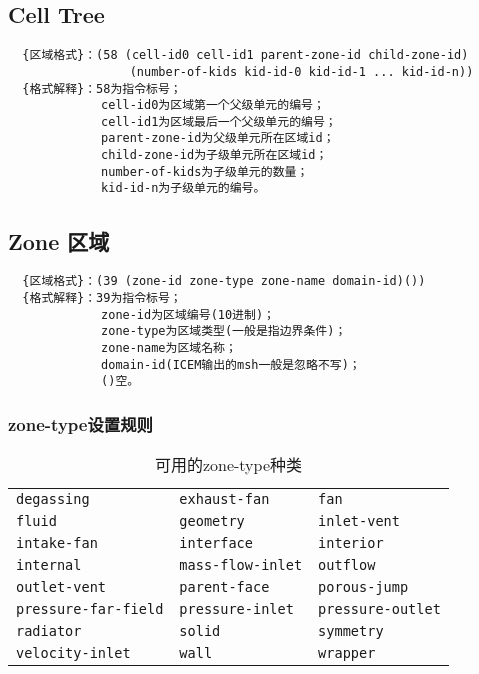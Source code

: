 \documentclass[lang=cn,11pt,a4paper]{elegantpaper}
\begin{document}
\subsection{Cell Tree}\label{Cell-Tree}
\begin{lstlisting}
  {区域格式}：(58 (cell-id0 cell-id1 parent-zone-id child-zone-id)
                 (number-of-kids kid-id-0 kid-id-1 ... kid-id-n))
  {格式解释}：58为指令标号；
             cell-id0为区域第一个父级单元的编号；
             cell-id1为区域最后一个父级单元的编号；
             parent-zone-id为父级单元所在区域id；
             child-zone-id为子级单元所在区域id；
             number-of-kids为子级单元的数量；
             kid-id-n为子级单元的编号。
\end{lstlisting}

\subsection{Zone 区域}\label{Zone}
\begin{lstlisting}
  {区域格式}：(39 (zone-id zone-type zone-name domain-id)())
  {格式解释}：39为指令标号；
             zone-id为区域编号(10进制)；
             zone-type为区域类型(一般是指边界条件)；
             zone-name为区域名称；
             domain-id(ICEM输出的msh一般是忽略不写)；
             ()空。
\end{lstlisting}

\subsubsection{zone-type设置规则}\label{zone-type}
\begin{table}[!htb]
  \centering
  \caption{可用的zone-type种类}
  \begin{tabular}{*{3}{l}}
   \hline
   \texttt{degassing}       & \texttt{exhaust-fan}   & \texttt{fan} \\
   \texttt{fluid}           & \texttt{geometry}      & \texttt{inlet-vent} \\
   \texttt{intake-fan}      & \texttt{interface}     & \texttt{interior} \\
   \texttt{internal}        & \texttt{mass-flow-inlet}          & \texttt{outflow} \\
   \texttt{outlet-vent}     & \texttt{parent-face}   & \texttt{porous-jump} \\
   \texttt{pressure-far-field}         & \texttt{pressure-inlet}     & \texttt{pressure-outlet} \\
   \texttt{radiator}        & \texttt{solid}         & \texttt{symmetry} \\
   \texttt{velocity-inlet}  & \texttt{wall}          & \texttt{wrapper} \\
   \hline
  \end{tabular}
\end{table}
\end{document}

